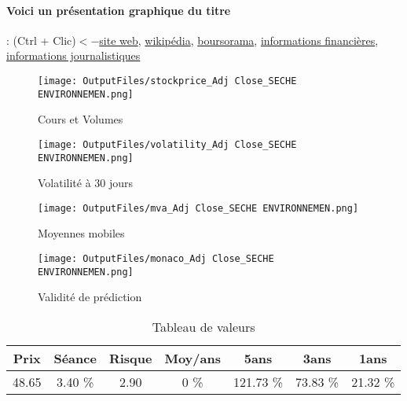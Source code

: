 \documentclass[11pt,a4paper]{report}%
\begin{document}
\paragraph{Voici un présentation graphique du titre} : (Ctrl + Clic)$<-$\href{https://www.groupe-seche.com/fr/}{site web}, \href{https://fr.wikipedia.org/wiki/S%C3%A9ch%C3%A9_Environnement}{wikipédia}, \href{https://www.boursorama.com/cours/1rPSCHP}{boursorama}, \href{https://www.qwant.com/?q=site:https:%2f%2fwww.easybourse.com%2faction-societe%2fSECHE-ENVIRONNEMEN&t=web&client=ext-firefox-hp}{informations financières}, \href{https://bourse.lerevenu.com/cours-de-bourse/fiche-valeur-synthese/SECHE-ENVIRONNEMEN/SCHP-FR}{informations journalistiques}
\begin{figure}[!htb]
   \begin{minipage}{0.5\textwidth}
     \centering
     \texttt{[image: OutputFiles/stockprice\_Adj Close\_SECHE ENVIRONNEMEN.png]}
     \caption{Cours et Volumes}\label{Fig:price_SECHE ENVIRONNEMEN}
   \end{minipage}\hfill
   \begin{minipage}{0.5\textwidth}
     \centering
     \texttt{[image: OutputFiles/volatility\_Adj Close\_SECHE ENVIRONNEMEN.png]}
     \caption{Volatilité à 30 jours}\label{Fig:volat_SECHE ENVIRONNEMEN}
   \end{minipage}
\end{figure}
\begin{figure}[!htb]
   \begin{minipage}{0.5\textwidth}
     \centering
     \texttt{[image: OutputFiles/mva\_Adj Close\_SECHE ENVIRONNEMEN.png]}
     \caption{Moyennes mobiles}\label{Fig:mva_SECHE ENVIRONNEMEN}
   \end{minipage}\hfill
   \begin{minipage}{0.5\textwidth}
     \centering
     \texttt{[image: OutputFiles/monaco\_Adj Close\_SECHE ENVIRONNEMEN.png]}
     \caption{Validité de prédiction}\label{Fig:prediction_SECHE ENVIRONNEMEN}
   \end{minipage}
\end{figure}

\begin{table}[H]
  \centering
    \begin{tabular}{|c|c|c|c|c|c|c|}
    \hline
    Prix & Séance & Risque  & Moy/ans & 5ans & 3ans & 1ans \\
    \hline
    48.65 &    3.40 \%    & 2.90 & 0 \% & 121.73 \% & 73.83 \% & 21.32 \% \\
    \hline
    \end{tabular}%
        \label{tab:table_SECHE ENVIRONNEMEN}%
      \caption{Tableau de valeurs}
\end{table}%
\end{document}
